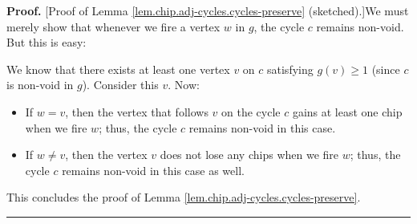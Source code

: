 \documentclass[numbers=enddot,12pt,final,onecolumn,notitlepage]{scrartcl}%
\theoremstyle{definition}
\newenvironment{proof}[1][Proof]{\noindent\textbf{#1.} }{\ \rule{0.5em}{0.5em}}
\begin{document}
\begin{proof}
[Proof of Lemma \ref{lem.chip.adj-cycles.cycles-preserve} (sketched).]We must
merely show that whenever we fire a vertex $w$ in $g$, the cycle $c$ remains
non-void. But this is easy:

We know that there exists at least one vertex $v$ on $c$ satisfying $g\left(
v\right)  \geq1$ (since $c$ is non-void in $g$). Consider this $v$. Now:

\begin{itemize}
\item If $w=v$, then the vertex that follows $v$ on the cycle $c$ gains at
least one chip when we fire $w$; thus, the cycle $c$ remains non-void in this case.

\item If $w\neq v$, then the vertex $v$ does not lose any chips when we fire
$w$; thus, the cycle $c$ remains non-void in this case as well.
\end{itemize}

This concludes the proof of Lemma \ref{lem.chip.adj-cycles.cycles-preserve}.
\end{proof}
\end{document}
